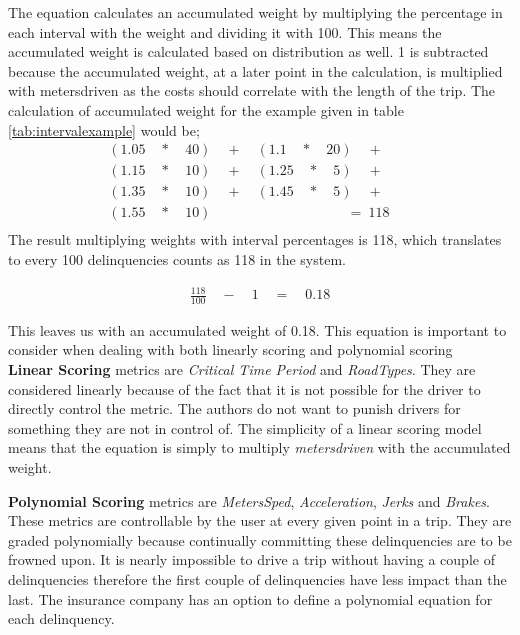 The equation calculates an accumulated weight by multiplying the percentage in each interval with the weight and dividing it with 100. This means the accumulated weight is calculated based on distribution as well. 1 is subtracted because the accumulated weight, at a later point in the calculation, is multiplied with metersdriven as the costs should correlate with the length of the trip. The calculation of accumulated weight for the example given in table \ref{tab:intervalexample} would be;
\begin{align*}
(1.05\quad *\quad 40)\quad +\quad (1.1\quad *\quad 20)\quad +\quad \quad \\ 
  (1.15\quad *\quad 10)\quad +\quad (1.25\quad *\quad 5)\quad +\quad \quad \\
  (1.35\quad *\quad 10)\quad +\quad (1.45\quad *\quad 5)\quad +\quad \quad \\
  (1.55\quad *\quad 10)\quad \quad \quad \quad \quad \quad \quad \quad \ \ \ \quad =\ 118 \\
\end{align*}
The result multiplying weights with interval percentages is 118, which translates to every 100 delinquencies counts as 118 in the system.

\begin{align*}
\frac { 118 }{ 100 } \quad -\quad 1\quad =\quad 0.18
\end{align*}


This leaves us with an accumulated weight of 0.18. This equation is important to consider when dealing with both linearly scoring and polynomial scoring\\

\textbf{Linear Scoring} metrics are \textit{Critical Time Period} and \textit{RoadTypes}. They are considered linearly because of the fact that it is not possible for the driver to directly control the metric. The authors do not want to punish drivers for something they are not in control of. 
The simplicity of a linear scoring model means that the equation is simply to multiply \textit{metersdriven} with the accumulated weight.

\textbf{Polynomial Scoring} metrics are \textit{MetersSped}, \textit{Acceleration}, \textit{Jerks} and \textit{Brakes}. These metrics are controllable by the user at every given point in a trip. They are graded polynomially because continually committing these delinquencies are to be frowned upon. It is nearly impossible to drive a trip without having a couple of delinquencies therefore the first couple of delinquencies have less impact than the last. The insurance company has an option to define a polynomial equation for each delinquency.

